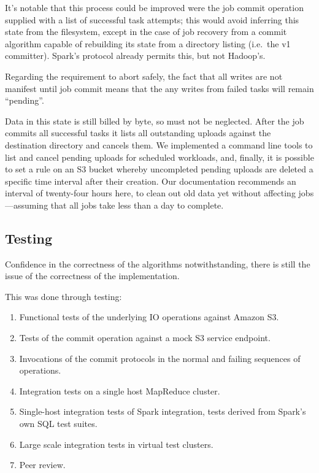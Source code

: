 \documentclass[format=acmsmall, screen=true, review=false]{acmart}
\begin{document}
It's notable that this process could be improved were the job commit
operation supplied with a list of successful task attempts;
this would avoid inferring this state from the filesystem, except in
the case of job recovery from a commit algorithm capable of
rebuilding its state from a directory listing (i.e.\ the v1 committer).
Spark's protocol already permits this, but not Hadoop's.

Regarding the requirement to abort safely, the fact that all writes are
not manifest until job commit means that the any writes from failed tasks
will remain ``pending''.

Data in this state is still billed by byte, so must not be neglected.
After the job commits all successful tasks it lists all outstanding
uploads against the destination directory and cancels them.
We implemented a command line tools to list and cancel pending uploads for
scheduled workloads, and, finally,
it is possible to set a rule on an S3 bucket whereby uncompleted
pending uploads are deleted a specific time interval after their creation.
Our documentation recommends an interval of twenty-four hours here, to
clean out old data yet without affecting jobs ---assuming that all jobs
take less than a day to complete.


\subsection{Testing}
\label{subsec:testing}

Confidence in the correctness of the algorithms notwithstanding, there
is still the issue of the correctness of the implementation.


This was done through testing:

\begin{enumerate}
  \item Functional tests of the underlying IO operations against Amazon S3.
  \item Tests of the commit operation against a mock S3 service endpoint.
  \item Invocations of the commit protocols in the normal and failing sequences of operations.
  \item Integration tests on a single host MapReduce cluster.
  \item Single-host integration tests of Spark integration, tests derived from Spark's own SQL test suites.
  \item Large scale integration tests in virtual test clusters.
  \item Peer review.
\end{enumerate}
\end{document}
